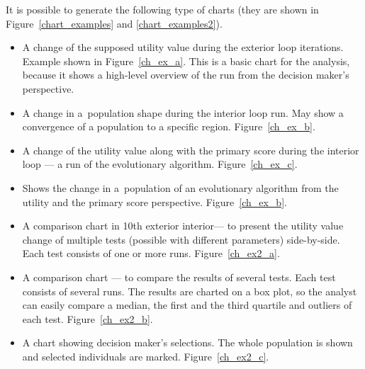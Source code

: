It is possible to generate the following type of charts (they are shown in
Figure~\ref{chart_examples} and \ref{chart_examples2}).
\begin{itemize}
\item A change of the supposed utility value during the exterior loop
  iterations. Example shown in Figure~\ref{ch_ex_a}. This is a basic chart for
  the analysis, because it shows a high-level overview of the run from the
  decision maker's perspective.
\item A change in a~population shape during the interior loop run. May show a
  convergence of a population to a specific region. Figure~\ref{ch_ex_b}.
\item A change of the utility value along with the primary score during the
  interior loop --- a run of the evolutionary algorithm. Figure~\ref{ch_ex_c}.
\item Shows the change in a~population of an evolutionary algorithm from the
  utility and the primary score perspective. Figure~\ref{ch_ex_b}.
\item A comparison chart in 10th exterior interior--- to present the utility
  value change of multiple tests (possible with different parameters)
  side-by-side. Each test consists of one or more runs. Figure~\ref{ch_ex2_a}.
\item A comparison chart --- to compare the results of several tests. Each
  test consists of several runs. The results are charted on a box plot, so the
  analyst can easily compare a median, the first and the third quartile and
  outliers of each test. Figure~\ref{ch_ex2_b}.
\item A chart showing decision maker's selections. The whole population is
  shown and selected individuals are marked. Figure~\ref{ch_ex2_c}.
\end{itemize}

